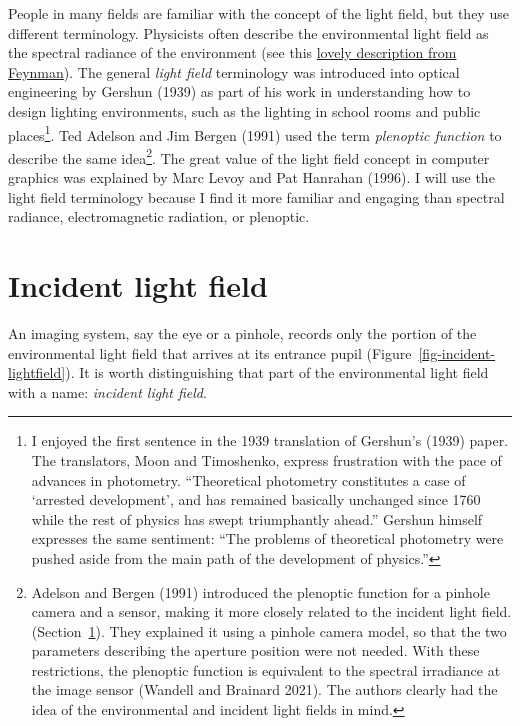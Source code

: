 \documentclass[
  letterpaper,
]{book}
\begin{document}
People in many fields are familiar with the concept of the light field,
but they use different terminology. Physicists often describe the
environmental light field as the spectral radiance of the environment
(see this \href{https://youtu.be/FjHJ7FmV0M4?si=wi2twZVYjF9KJGRY}{lovely
description from Feynman}). The general \emph{light field} terminology
was introduced into optical engineering by Gershun (1939) as part of his
work in understanding how to design lighting environments, such as the
lighting in school rooms and public places\footnote{I enjoyed the first
  sentence in the 1939 translation of Gershun's (1939) paper. The
  translators, Moon and Timoshenko, express frustration with the pace of
  advances in photometry. ``Theoretical photometry constitutes a case of
  `arrested development', and has remained basically unchanged since
  1760 while the rest of physics has swept triumphantly ahead.'' Gershun
  himself expresses the same sentiment: ``The problems of theoretical
  photometry were pushed aside from the main path of the development of
  physics.''}. Ted Adelson and Jim Bergen (1991) used the term
\emph{plenoptic function} to describe the same idea\footnote{Adelson and
  Bergen (1991) introduced the plenoptic function for a pinhole camera
  and a sensor, making it more closely related to the incident light
  field. (Section~\ref{sec-incident-lightfield}). They explained it
  using a pinhole camera model, so that the two parameters describing
  the aperture position were not needed. With these restrictions, the
  plenoptic function is equivalent to the spectral irradiance at the
  image sensor (Wandell and Brainard 2021). The authors clearly had the
  idea of the environmental and incident light fields in mind.}. The
great value of the light field concept in computer graphics was
explained by Marc Levoy and Pat Hanrahan (1996). I will use the light
field terminology because I find it more familiar and engaging than
spectral radiance, electromagnetic radiation, or plenoptic.

\section{Incident light field}\label{sec-incident-lightfield}

An imaging system, say the eye or a pinhole, records only the portion of
the environmental light field that arrives at its entrance pupil
(Figure~\ref{fig-incident-lightfield}). It is worth distinguishing that
part of the environmental light field with a name: \emph{incident light
field}.
\end{document}
